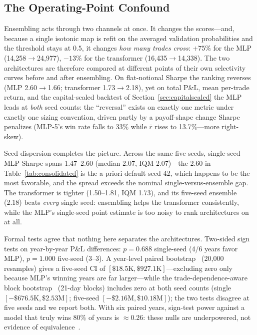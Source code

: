 \documentclass[sigconf,review]{acmart}
\begin{document}
\subsection{The Operating-Point Confound}
\label{sec:confound}
Ensembling acts through two channels at once. It changes the scores---and, because a single isotonic map is refit on the averaged validation probabilities and the threshold stays at $0.5$, it changes \emph{how many trades cross}: $+75\%$ for the MLP (14{,}258$\to$24{,}977), $-13\%$ for the transformer (16{,}435$\to$14{,}338). The two architectures are therefore compared at different points of their own selectivity curves before and after ensembling. On flat-notional Sharpe the ranking reverses (MLP 2.60$\to$1.66; transformer 1.73$\to$2.18), yet on total P\&L, mean per-trade return, and the capital-scaled backtest of Section~\ref{sec:capitalscaled} the MLP leads at \emph{both} seed counts: the ``reversal'' exists on exactly one metric under exactly one sizing convention, driven partly by a payoff-shape change Sharpe penalizes (MLP-5's win rate falls to 33\% while $\bar r$ rises to 13.7\%---more right-skew).

Seed dispersion completes the picture. Across the same five seeds, single-seed MLP Sharpe spans 1.47--2.60 (median 2.07, IQM 2.07)---the 2.60 in Table~\ref{tab:consolidated} is the a-priori default seed 42, which happens to be the most favorable, and the spread exceeds the nominal single-versus-ensemble gap. The transformer is tighter (1.50--1.81, IQM 1.73), and its five-seed ensemble (2.18) beats \emph{every} single seed: ensembling helps the transformer consistently, while the MLP's single-seed point estimate is too noisy to rank architectures on at all.

Formal tests agree that nothing here separates the architectures. Two-sided sign tests on year-by-year P\&L differences: $p=0.688$ single-seed (4/6 years favor MLP), $p=1.000$ five-seed (3--3). A year-level paired bootstrap~\cite{efron1993bootstrap} (20{,}000 resamples) gives a five-seed CI of $[\$18.5\text{K},\$927.1\text{K}]$---excluding zero only because MLP's winning years are far larger---while the trade-dependence-aware block bootstrap~\cite{kunsch1989} (21-day blocks) includes zero at both seed counts (single $[-\$676.5\text{K},\$2.53\text{M}]$; five-seed $[-\$2.16\text{M},\$10.18\text{M}]$); the two tests disagree at five seeds and we report both. With six paired years, sign-test power against a model that truly wins 80\% of years is $\approx$0.26: these nulls are underpowered, not evidence of equivalence~\cite{bouthillier2021accounting,agarwal2021deep}.
\end{document}
